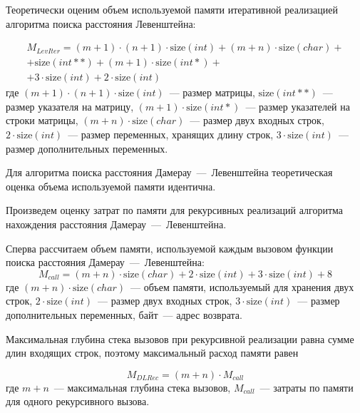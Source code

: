 Теоретически оценим объем используемой памяти итеративной реализацией алгоритма поиска расстояния Левенштейна:

\begin{multline}
    M_{LevIter} = (m + 1) \cdot (n + 1) \cdot \text{size}(int) + (m + n) \cdot \text{size}(char) + \\
    + \text{size}(int**) + (m + 1) \cdot \text{size}(int*) + \\
    + 3 \cdot \text{size}(int) + 2 \cdot \text{size}(int)
\end{multline}
где $(m + 1) \cdot (n + 1) \cdot \text{size}(int)$~--- размер матрицы,
\newline $\text{size}(int**)$~--- размер указателя на матрицу,
\newline $(m + 1) \cdot \text{size}(int*)$~--- размер указателей на строки матрицы,
\newline $(m + n) \cdot \text{size}(char)$~--- размер двух входных строк,
\newline $2 \cdot \text{size}(int)$~--- размер переменных, хранящих длину строк,
\newline $3 \cdot \text{size}(int)$~--- размер дополнительных переменных.

Для алгоритма поиска расстояния Дамерау~---~Левенштейна теоретическая оценка объема используемой памяти идентична.

Произведем оценку затрат по памяти для рекурсивных реализаций алгоритма нахождения расстояния Дамерау~---~Левенштейна.

Сперва рассчитаем объем памяти, используемой каждым вызовом функции поиска расстояния Дамерау~---~Левенштейна:
\begin{equation}
    M_{call} = (m + n) \cdot \text{size}(char) + 2 \cdot \text{size}(int) + 3 \cdot \text{size}(int) + 8
\end{equation}
где $(m + n) \cdot \text{size}(char)$~--- объем памяти, используемый для хранения двух строк,
\newline $2 \cdot \text{size}(int)$~--- размер двух входных строк,
\newline $3 \cdot \text{size}(int)$~--- размер дополнительных переменных,
 байт~--- адрес возврата.

Максимальная глубина стека вызовов при рекурсивной реализации равна сумме длин входящих строк, поэтому максимальный расход памяти равен

\begin{equation}
    M_{DLRec} = (m + n) \cdot M_{call}
\end{equation}
где $m + n$~--- максимальная глубина стека вызовов,
\newline $M_{call}$~--- затраты по памяти для одного рекурсивного вызова.

